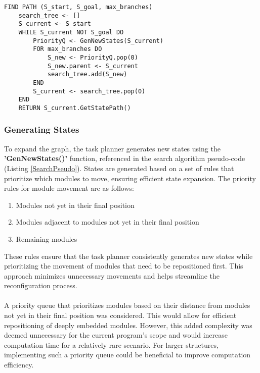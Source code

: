 \begin{lstlisting}[caption={Task Planner search algorithm pseudo-code},captionpos=b,label={SearchPseudo}]
FIND PATH (S_start, S_goal, max_branches)
	search_tree <- []
	S_current <- S_start
	WHILE S_current NOT S_goal DO
		PriorityQ <- GenNewStates(S_current)
		FOR max_branches DO
			S_new <- PriorityQ.pop(0)
			S_new.parent <- S_current
			search_tree.add(S_new)
		END	
		S_current <- search_tree.pop(0)
	END
	RETURN S_current.GetStatePath()
\end{lstlisting}

\subsubsection{Generating States}\label{genStates}
To expand the graph, the task planner generates new states using the \textbf{'GenNewStates()'} function, referenced in the search algorithm pseudo-code (Listing \ref{SearchPseudo}). States are generated based on a set of rules that prioritize which modules to move, ensuring efficient state expansion. The priority rules for module movement are as follows:
\begin{enumerate}[]
	\item Modules not yet in their final position
	\item Modules adjacent to modules not yet in their final position
	\item Remaining modules 
\end{enumerate}
These rules ensure that the task planner consistently generates new states while prioritizing the movement of modules that need to be repositioned first. This approach minimizes unnecessary movements and helps streamline the reconfiguration process.
\\\\
A priority queue that prioritizes modules based on their distance from modules not yet in their final position was considered. This would allow for efficient repositioning of deeply embedded modules. However, this added complexity was deemed unnecessary for the current program's scope and would increase computation time for a relatively rare scenario. For larger structures, implementing such a priority queue could be beneficial to improve computation efficiency.


